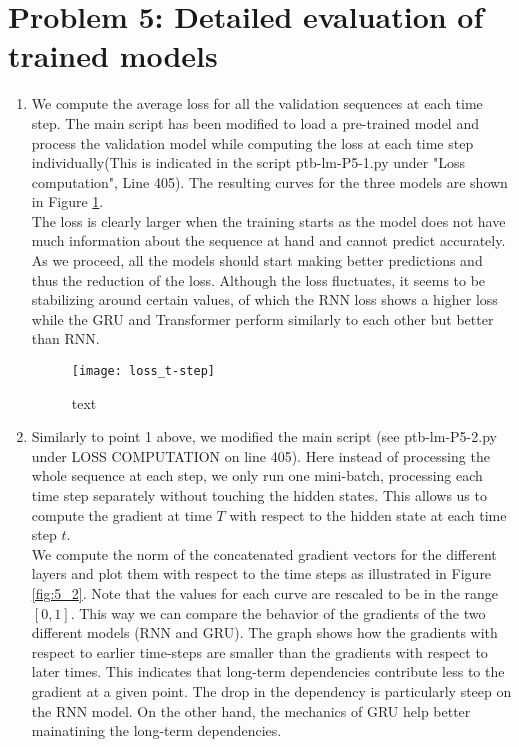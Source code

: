 \section{Problem 5: Detailed evaluation of trained models}
\begin{enumerate}
	\item
We compute the average loss for all the validation sequences at each time step. The main script has been modified to load a pre-trained model and process the validation model while computing the loss at each time step individually(This is indicated in the script ptb-lm-P5-1.py under "Loss computation", Line 405). The resulting curves for the three models are shown in Figure \ref{fig:5_1}. \\
The loss is clearly larger when the training starts as the model does not have much information about the sequence at hand and cannot predict accurately. As we proceed, all the models should start making better predictions and thus the reduction of the loss. Although the loss fluctuates, it seems to be stabilizing around certain values, of which the RNN loss shows a higher loss while the GRU and Transformer perform similarly to each other but better than RNN. 
\begin{figure}
	\centering
	\texttt{[image: loss\_t-step]}
	\caption{text}
	\label{fig:5_1}
\end{figure}
\item
Similarly to point 1 above, we modified the main script (see ptb-lm-P5-2.py under LOSS COMPUTATION on line 405). Here instead of processing the whole sequence at each step, we only run one mini-batch, processing each time step separately without touching the hidden states. This allows us to compute the gradient at time $T$ with respect to the hidden state at each time step $t$. \\
We compute the norm of the concatenated gradient vectors for the different layers and plot them with respect to the time steps as illustrated in Figure \ref{fig:5_2}. Note that the values for each curve are rescaled to be in the range $[0,1]$. This way we can compare the behavior of the gradients of the two different models (RNN and GRU). The graph shows how the gradients with respect to earlier time-steps are smaller than the gradients with respect to later times. This indicates that long-term dependencies contribute less to the gradient at a given point. The drop in the dependency is particularly steep on the RNN model. On the other hand, the mechanics of GRU help better mainatining the long-term dependencies. 

\end{enumerate}

